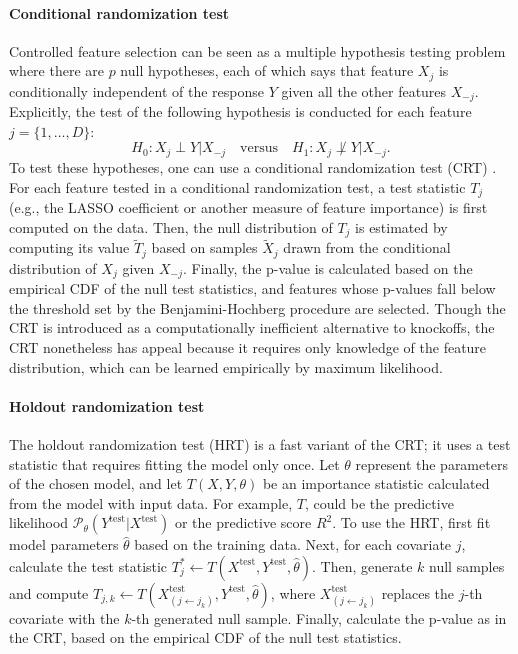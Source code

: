 \documentclass{article}
\begin{document}
\paragraph{Conditional randomization test}
Controlled feature selection can be seen as a multiple hypothesis testing problem where there are $p$ null hypotheses, each of which says that feature $X_j$ is conditionally independent of the response $Y$ given all the other features $X_{-j}$.
Explicitly, the test of the following hypothesis is conducted for each feature $j = \{1, \dots, D\}$:
\begin{equation}\label{eq:hypothesis}
    H_0: X_j \perp Y \vert X_{-j} \quad \text{versus} \quad H_1: X_j \not\perp Y \vert X_{-j}.
\end{equation}
To test these hypotheses, one can use a conditional randomization test (CRT) \citep{candesPanningGoldModelX2018}.
For each feature tested in a conditional randomization test, a test statistic $T_j$ (e.g., the LASSO coefficient or another measure of feature importance) is first computed on the data.
Then, the null distribution of $T_j$ is estimated by computing its value $\tilde T_j$ based on samples $\tilde X_j$ drawn from the conditional distribution of $X_j$ given $X_{-j}$.
Finally, the p-value is calculated based on the empirical CDF of the null test statistics, and features whose p-values fall below the threshold set by the Benjamini-Hochberg procedure \citep{Benjamini1995} are selected.
Though the CRT is introduced as a computationally inefficient alternative to knockoffs, the CRT nonetheless has appeal because it requires only knowledge of the feature distribution, which can be learned empirically by maximum likelihood.

\paragraph{Holdout randomization test}
\label{sec:hrt}
The holdout randomization test (HRT) \citep{tanseyHoldoutRandomizationTest2019} is a fast variant of the CRT; it uses a test statistic that requires fitting the model only once.
Let $\theta$ represent the parameters of the chosen model, and let $T(X, Y, \theta)$ be an importance statistic calculated from the model with input data.
For example, $T$, could be the predictive likelihood $\mathcal P_\theta (Y^{\text{test}}|X^{\text{test}})$ or the predictive score $R^2$.
To use the HRT, first fit model parameters $\hat \theta$ based on the training data.
Next, for each covariate $j$, calculate the test statistic $T^*_j \leftarrow T(X^{\text{test}}, Y^{\text{test}}, \hat \theta)$.
Then, generate $k$ null samples and compute $T_{j, k} \leftarrow T(X^{\text{test}}_{(j \leftarrow j_k)}, Y^{\text{test}}, \hat \theta)$, where $X^{\text{test}}_{(j \leftarrow j_k)}$ replaces the $j$-th covariate with the $k$-th generated null sample.
Finally, calculate the p-value as in the CRT, based on the empirical CDF of the null test statistics.
\end{document}
